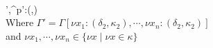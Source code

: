 \\[0.2cm]
	{\Gamma',\Pi\vdash [e_1^{p_1}\;:=\;e_2^{p_2}]^{p'}:(\delta,\emptyset)}\\
	Where $\Gamma'=\Gamma[\nu x_1:(\delta_2,\kappa_2),\cdots,\nu x_n:(\delta_2,\kappa_2)]$\\
	and $\nu x_1,\cdots,\nu x_n\in\{\nu x\mid\nu x\in\kappa\}$

